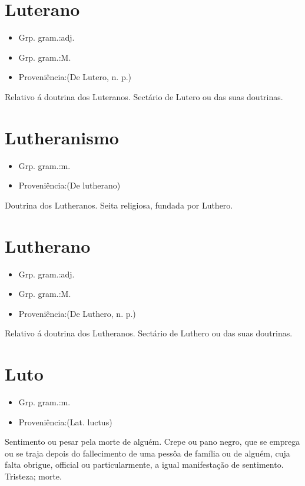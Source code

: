 \section{Luterano}
\begin{itemize}
\item {Grp. gram.:adj.}
\end{itemize}
\begin{itemize}
\item {Grp. gram.:M.}
\end{itemize}
\begin{itemize}
\item {Proveniência:(De \textunderscore Lutero\textunderscore , n. p.)}
\end{itemize}
Relativo á doutrina dos Luteranos.
Sectário de Lutero ou das suas doutrinas.
\section{Lutheranismo}
\begin{itemize}
\item {Grp. gram.:m.}
\end{itemize}
\begin{itemize}
\item {Proveniência:(De \textunderscore lutherano\textunderscore )}
\end{itemize}
Doutrina dos Lutheranos.
Seita religiosa, fundada por Luthero.
\section{Lutherano}
\begin{itemize}
\item {Grp. gram.:adj.}
\end{itemize}
\begin{itemize}
\item {Grp. gram.:M.}
\end{itemize}
\begin{itemize}
\item {Proveniência:(De \textunderscore Luthero\textunderscore , n. p.)}
\end{itemize}
Relativo á doutrina dos Lutheranos.
Sectário de Luthero ou das suas doutrinas.
\section{Luto}
\begin{itemize}
\item {Grp. gram.:m.}
\end{itemize}
\begin{itemize}
\item {Proveniência:(Lat. \textunderscore luctus\textunderscore )}
\end{itemize}
Sentimento ou pesar pela morte de alguém.
Crepe ou pano negro, que se emprega ou se traja depois do fallecimento de uma pessôa de família ou de alguém, cuja falta obrigue, official ou particularmente, a igual manifestação de sentimento.
Tristeza; morte.
